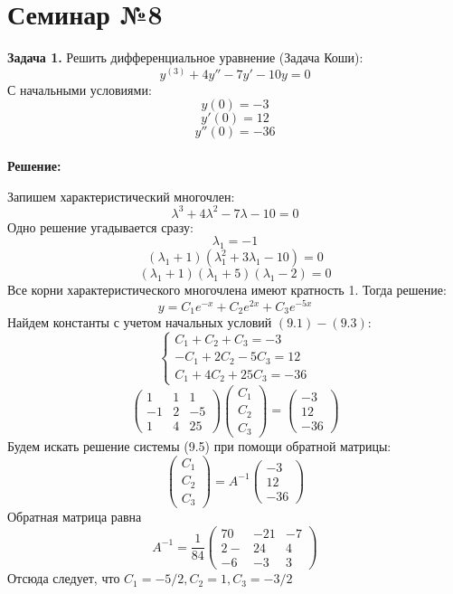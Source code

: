 \documentclass[10pt]{report}
\begin{document}
\chapter[{Семинар №8}]{Семинар №8}
\thispagestyle{empty}

\textbf{Задача 1.} Решить дифференциальное уравнение (Задача Коши): 
\begin{equation}
y^{(3)}+4y''-7y'-10y=0
\end{equation}
С начальными условиями:
\begin{equation}
y(0)=-3
\end{equation}
\begin{equation}
y'(0)=12
\end{equation}
\begin{equation}
y''(0)=-36
\end{equation}\\
\textbf{Решение:} \par
Запишем характеристический многочлен:
\[\lambda^3+4\lambda^2-7\lambda-10=0\]
Одно решение угадывается сразу:
\[\lambda_1=-1\]
\[(\lambda_1+1)(\lambda_1^2+3\lambda_1-10)=0\]
\[(\lambda_1+1)(\lambda_1+5)(\lambda_1-2)=0\]
Все корни характеристического многочлена имеют кратность 1. Тогда решение:
\[y=C_1e^{-x}+C_2e^{2x}+C_3e^{-5x}\]
Найдем константы с учетом начальных условий $(9.1)-(9.3)$:
\begin{equation}
\left\{
\begin{array}{lr}
C_1+C_2+C_3=-3\\
-C_1+2C_2-5C_3=12\\
C_1+4C_2+25C_3=-36
\end{array}
\right.
\end{equation}
\[\left(
\begin{array}{ccc}
1 & 1 & 1\\
-1 & 2 & -5\\
1 & 4 & 25
\end{array}
\right)\left(
\begin{array}{c}
C_1\\
C_2\\
C_3
\end{array}
\right)=
\left(
\begin{array}{c}
-3\\
12\\
-36
\end{array}
\right)\]
Будем искать решение системы (9.5) при помощи обратной матрицы:
\[\left(
\begin{array}{c}
C_1\\
C_2\\
C_3
\end{array}
\right)=A^{-1}
\left(
\begin{array}{c}
-3\\
12\\
-36
\end{array}
\right)\]
Обратная матрица равна 
\[ A^{-1} = \frac 1 {84}
\left(
\begin{array}{ccc}
70 & -21 & -7\\
2- & 24 & 4\\
-6 & -3 & 3
\end{array}
\right)\]
Отсюда следует, что $C_1=-5/2, C_2 = 1, C_3=-3/2$
\end{document}
